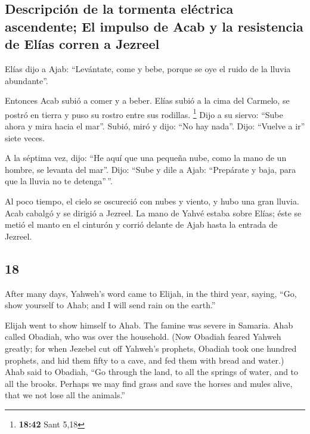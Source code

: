 \begin{paracol}{2}
\hypertarget{descripciuxf3n-de-la-tormenta-eluxe9ctrica-ascendente-el-impulso-de-acab-y-la-resistencia-de-eluxedas-corren-a-jezreel}{%
\subsection{Descripción de la tormenta eléctrica ascendente; El impulso
de Acab y la resistencia de Elías corren a
Jezreel}\label{descripciuxf3n-de-la-tormenta-eluxe9ctrica-ascendente-el-impulso-de-acab-y-la-resistencia-de-eluxedas-corren-a-jezreel}}

 Elías dijo a Ajab: ``Levántate, come y bebe, porque se
oye el ruido de la lluvia abundante''.

 Entonces Acab subió a comer y a beber. Elías subió a la
cima del Carmelo, se postró en tierra y puso su rostro entre sus
rodillas. \footnote{\textbf{18:42} Sant 5,18}  Dijo a su
siervo: ``Sube ahora y mira hacia el mar''. Subió, miró y dijo: ``No hay
nada''. Dijo: ``Vuelve a ir'' siete veces.

 A la séptima vez, dijo: ``He aquí que una pequeña nube,
como la mano de un hombre, se levanta del mar''. Dijo: ``Sube y dile a
Ajab: ``Prepárate y baja, para que la lluvia no te detenga''\,''.

 Al poco tiempo, el cielo se oscureció con nubes y
viento, y hubo una gran lluvia. Acab cabalgó y se dirigió a Jezreel.
 La mano de Yahvé estaba sobre Elías; éste se metió el
manto en el cinturón y corrió delante de Ajab hasta la entrada de
Jezreel.

\switchcolumn
\begin{otherlanguage}{english}

\hypertarget{section-35}{%
\section{18}\label{section-35}}

 After many days, Yahweh's word came to Elijah, in the
third year, saying, ``Go, show yourself to Ahab; and I will send rain on
the earth.''

 Elijah went to show himself to Ahab. The famine was
severe in Samaria.  Ahab called Obadiah, who was over the
household. (Now Obadiah feared Yahweh greatly;  for when
Jezebel cut off Yahweh's prophets, Obadiah took one hundred prophets,
and hid them fifty to a cave, and fed them with bread and water.)
 Ahab said to Obadiah, ``Go through the land, to all the
springs of water, and to all the brooks. Perhaps we may find grass and
save the horses and mules alive, that we not lose all the animals.''


\end{otherlanguage}
\end{paracol}
